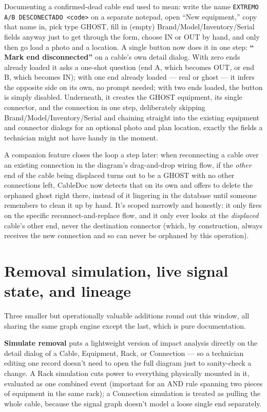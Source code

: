 \documentclass[10.4pt,twocolumn]{article}
\begin{document}
Documenting a confirmed-dead cable end used to mean: write the name \texttt{EXTREMO A/B DESCONECTADO <code>} on a separate notepad, open ``New equipment,'' copy that name in, pick type GHOST, fill in (empty) Brand/Model/Inventory/Serial fields anyway just to get through the form, choose IN or OUT by hand, and only then go load a photo and a location. A single button now does it in one step: \textbf{``🔌 Mark end disconnected''} on a cable's own detail dialog. With zero ends already loaded it asks a one-shot question (end A, which becomes OUT, or end B, which becomes IN); with one end already loaded --- real or ghost --- it infers the opposite side on its own, no prompt needed; with two ends loaded, the button is simply disabled. Underneath, it creates the GHOST equipment, its single connector, and the connection in one step, deliberately skipping Brand/Model/Inventory/Serial and chaining straight into the existing equipment and connector dialogs for an optional photo and plan location, exactly the fields a technician might not have handy in the moment.

A companion feature closes the loop a step later: when reconnecting a cable over an existing connection in the diagram's drag-and-drop wiring flow, if the \emph{other} end of the cable being displaced turns out to be a GHOST with no other connections left, CableDoc now detects that on its own and offers to delete the orphaned ghost right there, instead of it lingering in the database until someone remembers to clean it up by hand. It's scoped narrowly and honestly: it only fires on the specific reconnect-and-replace flow, and it only ever looks at the \emph{displaced} cable's other end, never the destination connector (which, by construction, always receives the new connection and so can never be orphaned by this operation).

\section{Removal simulation, live signal state, and lineage}

Three smaller but operationally valuable additions round out this window, all sharing the same graph engine except the last, which is pure documentation.

\textbf{Simulate removal} puts a lightweight version of impact analysis directly on the detail dialog of a Cable, Equipment, Rack, or Connection --- so a technician editing one record doesn't need to open the full diagram just to sanity-check a change. A Rack simulation cuts power to everything physically mounted in it, evaluated as one combined event (important for an AND rule spanning two pieces of equipment in the same rack); a Connection simulation is treated as pulling the whole cable, because the signal graph doesn't model a loose single end separately.
\end{document}
